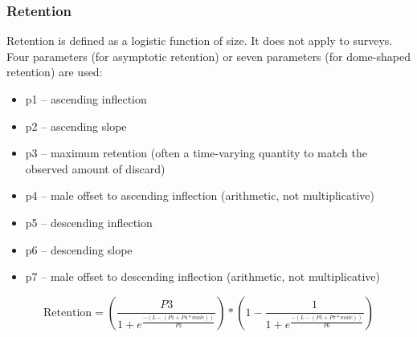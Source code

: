 	

\subsubsection{Retention}
Retention is defined as a logistic function of size.  It does not apply to surveys.  Four parameters (for asymptotic retention) or seven parameters (for dome-shaped retention) are used:
\begin{itemize}
	\item p1 – ascending inflection
	\item p2 – ascending slope
	\item p3 – maximum retention (often a time-varying quantity to match the observed amount of discard)
	\item p4 – male offset to ascending inflection (arithmetic, not multiplicative)
	\item p5 – descending inflection
	\item p6 – descending slope
	\item p7 – male offset to descending inflection (arithmetic, not multiplicative)
\end{itemize}
\begin{equation}
	\text{Retention} = \left(\frac{P3}{1 + e^{\frac{-(L-(P1+P4*male))}{P2}}}\right)*\left(1 - \frac{1}{1 + e^{\frac{-(L-(P5+P7*male))}{P6}}}\right)
\end{equation}

